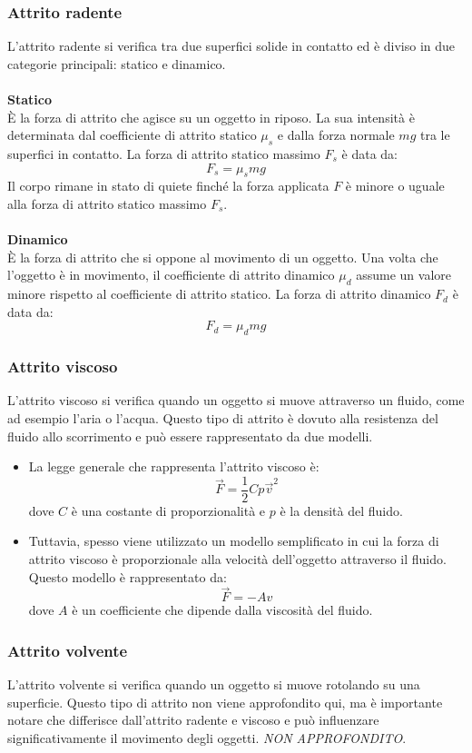 \documentclass{article}
\begin{document}
\subsubsection{Attrito radente}
L'attrito radente si verifica tra due superfici solide in contatto ed è diviso in due categorie principali: statico e dinamico.\\
\\
\textbf{Statico}\\
È la forza di attrito che agisce su un oggetto in riposo. La sua intensità è determinata dal coefficiente di attrito statico \( \mu_s \) e dalla forza normale \( mg \) tra le superfici in contatto. La forza di attrito statico massimo \( F_s \) è data da:
\[
    F_s = \mu_smg
\]
Il corpo rimane in stato di quiete finché la forza applicata \( F \) è minore o uguale alla forza di attrito statico massimo \( F_s \).\\
\\
\textbf{Dinamico}\\
È la forza di attrito che si oppone al movimento di un oggetto. Una volta che l'oggetto è in movimento, il coefficiente di attrito dinamico \( \mu_d \) assume un valore minore rispetto al coefficiente di attrito statico. La forza di attrito dinamico \( F_d \) è data da:
\[
    F_d = \mu_dmg
\]
\subsubsection{Attrito viscoso}
L'attrito viscoso si verifica quando un oggetto si muove attraverso un fluido, come ad esempio l'aria o l'acqua. Questo tipo di attrito è dovuto alla resistenza del fluido allo scorrimento e può essere rappresentato da due modelli.
\begin{itemize}
    \item La legge generale che rappresenta l'attrito viscoso è:
    \[ \Vec{F} = \frac{1}{2}Cp\Vec{v}^2 \]
    dove \( C \) è una costante di proporzionalità e \( p \) è la densità del fluido.
    \item Tuttavia, spesso viene utilizzato un modello semplificato in cui la forza di attrito viscoso è proporzionale alla velocità dell'oggetto attraverso il fluido. Questo modello è rappresentato da:
    \[ \Vec{F} = - Av \]
    dove \( A \) è un coefficiente che dipende dalla viscosità del fluido.
\end{itemize}

\subsubsection{Attrito volvente}
L'attrito volvente si verifica quando un oggetto si muove rotolando su una superficie. Questo tipo di attrito non viene approfondito qui, ma è importante notare che differisce dall'attrito radente e viscoso e può influenzare significativamente il movimento degli oggetti.
\textit{NON APPROFONDITO}.
\end{document}
